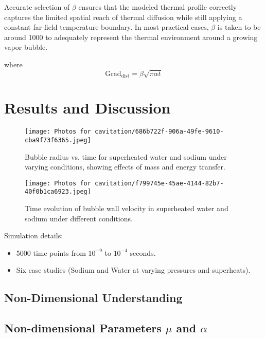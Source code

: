 \documentclass[aps,pre,twocolumn,superscriptaddress,floatfix]{revtex4-2}
\begin{document}
Accurate selection of $\beta$ ensures that the modeled thermal profile correctly captures the limited spatial reach of thermal diffusion while still applying a constant far-field temperature boundary. In most practical cases, $\beta$ is taken to be around 1000 to adequately represent the thermal environment around a growing vapor bubble.

where
\begin{equation}
\text{Grad}_{\text{dist}} = \beta \sqrt{\pi \alpha t}
\end{equation}

\section{Results and Discussion}

\begin{figure}[ht]
    \centering
    \texttt{[image: Photos for cavitation/686b722f-906a-49fe-9610-cba9f73f6365.jpeg]}
    \caption{Bubble radius vs. time for superheated water and sodium under varying conditions, showing effects of mass and energy transfer.}
    \label{fig:your_label}
\end{figure}

\begin{figure}[ht]
    \centering
    \texttt{[image: Photos for cavitation/f799745e-45ae-4144-82b7-40f0b1ca6923.jpeg]}
    \caption{Time evolution of bubble wall velocity in superheated water and sodium under different conditions.}
    \label{fig:your_label}
\end{figure}


Simulation details:
\begin{itemize}
    \item 5000 time points from $10^{-9}$ to $10^{-4}$ seconds.
    \item Six case studies (Sodium and Water at varying pressures and superheats).
\end{itemize}



\subsection{Non-Dimensional Understanding}

\subsection{Non-dimensional Parameters $\mu$ and $\alpha$}
\end{document}
